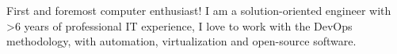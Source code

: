 \documentclass[9pt]{style/developercv}
\begin{document}
\vspace{0.5cm}



\begin{minipage}[t]{0.4\textwidth} %
	\vspace{-\baselineskip} %

  First and foremost computer enthusiast! I am a solution-oriented engineer with >6 years of professional IT experience,
  I love to work with the DevOps methodology, with automation, virtualization and open-source software.

\end{minipage}
\hfill %
\begin{minipage}[t]{0.5\textwidth} %
	\vspace{-\baselineskip} %
  \begin{barchart}{5.5}
	\end{barchart}
\end{minipage}

\vspace{1cm}

\end{document}
